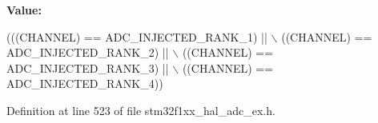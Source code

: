 {\bfseries Value\+:}
\begin{DoxyCode}
(((CHANNEL) == ADC\_INJECTED\_RANK\_1) || \(\backslash\)
                                       ((CHANNEL) == ADC\_INJECTED\_RANK\_2) || \(\backslash\)
                                       ((CHANNEL) == ADC\_INJECTED\_RANK\_3) || \(\backslash\)
                                       ((CHANNEL) == ADC\_INJECTED\_RANK\_4))
\end{DoxyCode}


Definition at line 523 of file stm32f1xx\+\_\+hal\+\_\+adc\+\_\+ex.\+h.


